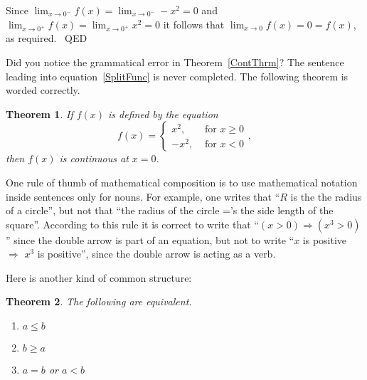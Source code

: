 \documentclass{article}
\newtheorem{theorem}{Theorem}
\newenvironment{proof}{{\sc Proof:}}{~\hfill QED}
\begin{document}
\begin{proof}
    Since
          $\lim_{x \rightarrow 0^{-}} f(x) =
           \lim_{x \rightarrow 0^{-}} -x^{2} = 0$
    and
          $\lim_{x \rightarrow 0^{+}} f(x) =
           \lim_{x \rightarrow 0^{+}} x^{2} = 0$
    it follows that
         $\lim_{x \rightarrow 0} f(x) = 0 = f(x)$,
         as required.
\end{proof}





   Did you notice the grammatical error in
   Theorem~\ref{ContThrm}?  The sentence leading
   into equation~\ref{SplitFunc} is never completed.
   The following
   theorem is worded correctly.
\begin{theorem}
    If $f(x)$ is defined by the equation
    \begin{equation}
         f(x) = \left\{ \begin{array}{rl}
                          x^{2}, & \mbox{~for $x \geq 0$} \\
                         -x^{2}, & \mbox{~for $x < 0$}
                         \end{array}\right.,
   \end{equation}
   then $f(x)$ is continuous at $x=0$.
\end{theorem}

   One rule of thumb of mathematical composition is to
   use mathematical notation inside sentences only for
   nouns.  For example, one writes that ``$R$ is the the
   radius of a circle'', but not that ``the radius of the
   circle ='s the side length of the square''.  According to
   this rule it is correct to write that
   ``$(x>0) \Rightarrow (x^{3} > 0)$'' since the double arrow is part of
   an equation, but not to write
   ``$x$ is positive $\Rightarrow$ $x^{3}$ is positive'', since the
   double arrow is acting as a verb.

Here is another kind of common structure:

\begin{theorem}
   The following are equivalent.
   \begin{enumerate}
      \item $a \leq b$
      \item $b \geq a$
      \item $a = b$ or $a<b$
   \end{enumerate}
\end{theorem}
\end{document}
